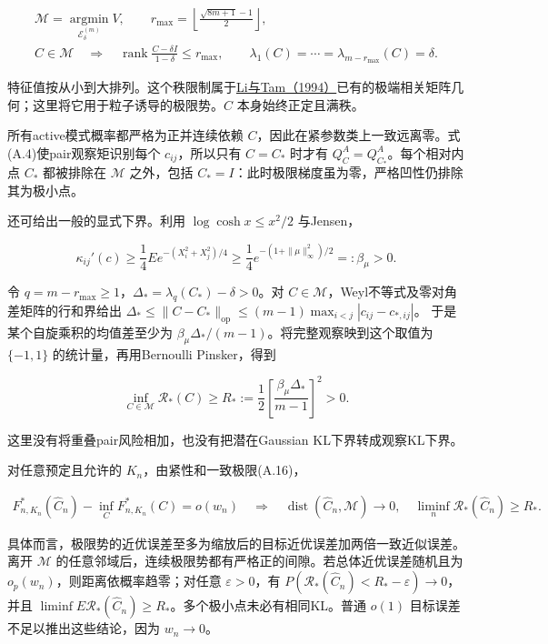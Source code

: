 \documentclass[11pt,a4paper]{article}
\begin{document}
\[
\begin{gathered}
\mathcal M=\operatorname*{argmin}_{\mathcal E_\delta^{(m)}}V,\qquad
r_{\max}=\left\lfloor\frac{\sqrt{8m+1}-1}{2}\right\rfloor,\\
C\in\mathcal M\quad\Longrightarrow\quad
\operatorname{rank}\frac{C-\delta I}{1-\delta}\le r_{\max},\qquad
\lambda_1(C)=\cdots=\lambda_{m-r_{\max}}(C)=\delta .
\end{gathered}
\tag{A.17}
\]

特征值按从小到大排列。这个秩限制属于\href{https://doi.org/10.1137/S0895479892240683}{Li与Tam（1994）}已有的极端相关矩阵几何；这里将它用于粒子诱导的极限势。\(C\)
本身始终正定且满秩。

所有active模式概率都严格为正并连续依赖
\(C\)，因此在紧参数类上一致远离零。式(A.4)使pair观察矩识别每个
\(c_{ij}\)，所以只有 \(C=C_*\) 时才有 \(Q_C^A=Q_{C_*}^A\)。每个相对内点
\(C_*\) 都被排除在 \(\mathcal M\) 之外，包括
\(C_*=I\)：此时极限梯度虽为零，严格凹性仍排除其为极小点。

还可给出一般的显式下界。利用 \(\log\cosh x\le x^2/2\) 与Jensen，

\[
\kappa_{ij}'(c)\ge\frac14
E e^{-(X_i^2+X_j^2)/4}
\ge\frac14e^{-(1+\|\mu\|_\infty^2)/2}
=:\beta_\mu>0 .
\tag{A.18}
\]

令 \(q=m-r_{\max}\ge1\)，\(\Delta_*=\lambda_q(C_*)-\delta>0\)。对
\(C\in\mathcal M\)，Weyl不等式及零对角差矩阵的行和界给出
\(\Delta_*\le\|C-C_*\|_{\mathrm{op}}\le(m-1)\max_{i<j}|c_{ij}-c_{*,ij}|\)。
于是某个自旋乘积的均值差至少为
\(\beta_\mu\Delta_* /(m-1)\)。将完整观察映到这个取值为 \(\{-1,1\}\)
的统计量，再用Bernoulli Pinsker，得到

\[
\inf_{C\in\mathcal M}\mathcal R_*(C)
\ge R_*:=\frac12\left[\frac{\beta_\mu\Delta_*}{m-1}\right]^2>0 .
\tag{A.19}
\]

这里没有将重叠pair风险相加，也没有把潜在Gaussian KL下界转成观察KL下界。

对任意预定且允许的 \(K_n\)，由紧性和一致极限(A.16)，

\[
\begin{gathered}
F_{n,K_n}^*(\widehat C_n)-\inf_C F_{n,K_n}^*(C)=o(w_n)
\quad\Longrightarrow\quad
\operatorname{dist}(\widehat C_n,\mathcal M)\to0,\quad
\liminf_n\mathcal R_*(\widehat C_n)\ge R_* .
\end{gathered}
\tag{A.20}
\]

具体而言，极限势的近优误差至多为缩放后的目标近优误差加两倍一致近似误差。离开
\(\mathcal M\)
的任意邻域后，连续极限势都有严格正的间隙。若总体近优误差随机且为
\(o_p(w_n)\)，则距离依概率趋零；对任意 \(\varepsilon>0\)，有
\(P(\mathcal R_*(\widehat C_n)<R_*-\varepsilon)\to0\)，并且
\(\liminf E\mathcal R_*(\widehat C_n)\ge R_*\)。多个极小点未必有相同KL。普通
\(o(1)\) 目标误差不足以推出这些结论，因为 \(w_n\to0\)。
\end{document}
